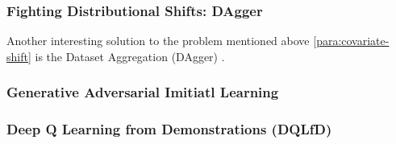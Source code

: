 \subsubsection{Fighting Distributional Shifts: DAgger}
Another interesting solution to the problem mentioned above \ref{para:covariate-shift} is the Dataset Aggregation (DAgger) \cite{ross2011reductionimitationlearningstructured}. 

\subsubsection{Generative Adversarial Imitiatl Learning}
\cite{ho2016generativeadversarialimitationlearning}

\subsubsection{Deep Q Learning from Demonstrations (DQLfD)}